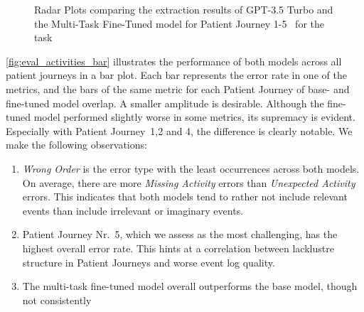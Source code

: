 \begin{figure}[h]
  \caption{Radar Plots comparing the extraction results of GPT-3.5 Turbo and the Multi-Task Fine-Tuned model for Patient Journey 1-5~ for the task }
  \label{fig:eval_activities_rad}
\end{figure}
\autoref{fig:eval_activities_bar} illustrates the performance of both models across all patient journeys in a bar plot. Each bar represents the error rate in one of the metrics, and the bars of the same metric for each Patient Journey of base- and fine-tuned model overlap. A smaller amplitude is desirable. Although the fine-tuned model performed slightly worse in some metrics, its supremacy is evident. Especially with Patient Journey~1,2 and 4, the difference is clearly notable. We make the following observations:
\begin{enumerate}
    \item \emph{Wrong Order} is the error type with the least occurrences across both models. On average, there are more \emph{Missing Activity} errors than \emph{Unexpected Activity} errors. This indicates that both models tend to rather not include relevant events than include irrelevant or imaginary events.
    \item Patient Journey Nr.~5, which we assess as the most challenging, has the highest overall error rate. This hints at a correlation between lacklustre structure in Patient Journeys and worse event log quality.
    \item The multi-task fine-tuned model overall outperforms the base model, though not consistently
\end{enumerate}

